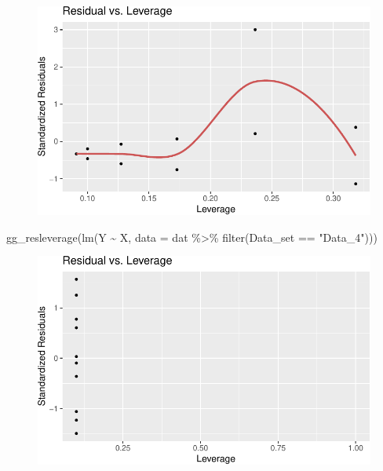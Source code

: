 \documentclass[
  letterpaper,
  DIV=11,
  numbers=noendperiod]{scrreprt}
\newenvironment{Shaded}{\begin{snugshade}}{\end{snugshade}}
\newcommand{\AttributeTok}[1]{\textcolor[rgb]{0.40,0.45,0.13}{#1}}
\newcommand{\FunctionTok}[1]{\textcolor[rgb]{0.28,0.35,0.67}{#1}}
\newcommand{\NormalTok}[1]{\textcolor[rgb]{0.00,0.23,0.31}{#1}}
\newcommand{\SpecialCharTok}[1]{\textcolor[rgb]{0.37,0.37,0.37}{#1}}
\newcommand{\StringTok}[1]{\textcolor[rgb]{0.13,0.47,0.30}{#1}}
\begin{document}
\begin{figure}[H]

{\centering \includegraphics{./08-linearreg_files/figure-pdf/unnamed-chunk-29-3.pdf}

}

\end{figure}

\begin{Shaded}
\begin{Highlighting}[]
\FunctionTok{gg\_resleverage}\NormalTok{(}\FunctionTok{lm}\NormalTok{(Y }\SpecialCharTok{\textasciitilde{}}\NormalTok{ X, }\AttributeTok{data =}\NormalTok{ dat }\SpecialCharTok{\%\textgreater{}\%} \FunctionTok{filter}\NormalTok{(Data\_set }\SpecialCharTok{==} \StringTok{"Data\_4"}\NormalTok{)))}
\end{Highlighting}
\end{Shaded}

\begin{figure}[H]

{\centering \includegraphics{./08-linearreg_files/figure-pdf/unnamed-chunk-29-4.pdf}

}

\end{figure}
\end{document}
